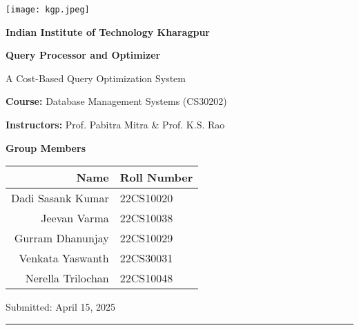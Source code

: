 \documentclass[12pt,a4paper]{article}
\begin{document}
\begin{titlepage}
    \centering
    \vspace*{0.5cm}
    
    \texttt{[image: kgp.jpeg]}\par
    \vspace{1cm}
    
    {\LARGE \textbf{Indian Institute of Technology Kharagpur}}\par
    \vspace{0.8cm}
    {\Huge \textbf{Query Processor and Optimizer}}\par
    \vspace{0.4cm}
    
    {\Large A Cost-Based Query Optimization System}\par
    \vspace{1.2cm}
    
    {\large \textbf{Course:} Database Management Systems (CS30202)}\par
    \vspace{0.3cm}
    {\large \textbf{Instructors:} Prof. Pabitra Mitra \& Prof. K.S. Rao}\par
    \vspace{1.5cm}
    
    {\large \textbf{Group Members}}\par
    \vspace{0.5cm}
    \begin{tabular}{rl}
        \textbf{Name} & \textbf{Roll Number} \\
        \hline
        Dadi Sasank Kumar & 22CS10020 \\
        Jeevan Varma & 22CS10038 \\
        Gurram Dhanunjay & 22CS10029 \\
        Venkata Yaswanth & 22CS30031 \\
        Nerella Trilochan & 22CS10048 \\
    \end{tabular}
    
    \vfill
    
    {\large Submitted: April 15, 2025}\par
    \vspace{0.5cm}
    
    \rule{0.5\textwidth}{0.4pt}
\end{titlepage}
\end{document}
